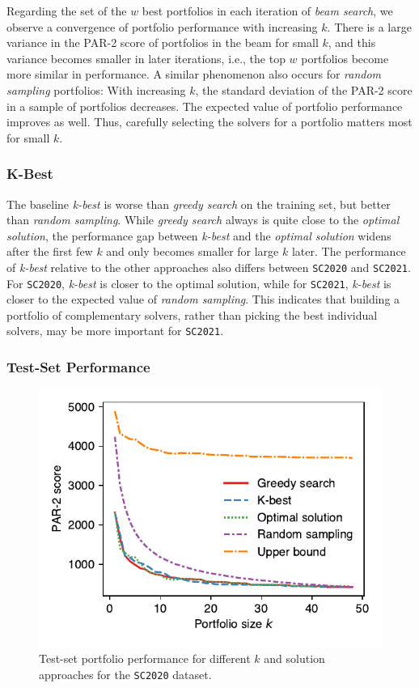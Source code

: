 \documentclass[conference]{IEEEtran}
\begin{document}
Regarding the set of the $w$ best portfolios in each iteration of \emph{beam search}, we observe a convergence of portfolio performance with increasing $k$. 
There is a large variance in the PAR-2 score of portfolios in the beam for small $k$, and this variance becomes smaller in later iterations, i.e., the top $w$ portfolios become more similar in performance.
A similar phenomenon also occurs for \emph{random sampling} portfolios:
With increasing $k$, the standard deviation of the PAR-2 score in a sample of portfolios decreases.
The expected value of portfolio performance improves as well.
Thus, carefully selecting the solvers for a portfolio matters most for small $k$.

\subsubsection{K-Best}

The baseline \emph{k-best} is worse than \emph{greedy search} on the training set, but better than \emph{random sampling}.
While \emph{greedy search} always is quite close to the \emph{optimal solution}, the performance gap between \emph{k-best} and the \emph{optimal solution} widens after the first few $k$ and only becomes smaller for large $k$ later.
The performance of \emph{k-best} relative to the other approaches also differs between \texttt{SC2020} and \texttt{SC2021}.
For \texttt{SC2020}, \emph{k-best} is closer to the optimal solution, while for \texttt{SC2021}, \emph{k-best} is closer to the expected value of \emph{random sampling}.
This indicates that building a portfolio of complementary solvers, rather than picking the best individual solvers, may be more important for \texttt{SC2021}. 

\subsubsection{Test-Set Performance}

\begin{figure}[t]
	\centering
	\includegraphics[width=0.9\columnwidth]{plots/search-test-objective-2020.pdf}
	\caption{Test-set portfolio performance for different $k$ and solution approaches for the \texttt{SC2020} dataset.}
	\label{fig:search-test-objective-2020}
\end{figure}
\end{document}
